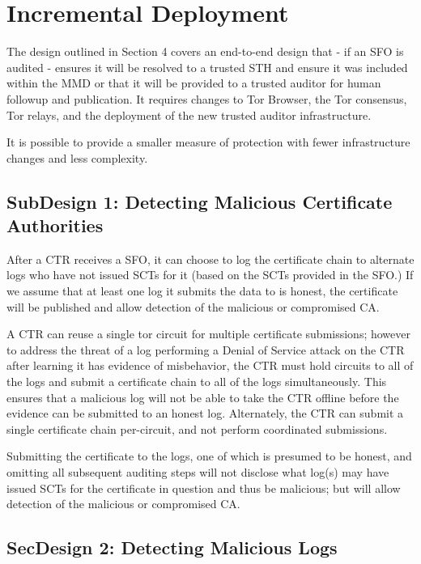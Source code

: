 \section{Incremental Deployment} \label{sec:incremental}

The design outlined in Section 4 covers an end-to-end design that - if an SFO
is audited - ensures it will be resolved to a trusted STH and ensure it was
included within the MMD or that it will be provided to a trusted auditor for
human followup and publication. It requires changes to Tor Browser, the Tor
consensus, Tor relays, and the deployment of the new trusted auditor
infrastructure.

It is possible to provide a smaller measure of protection with fewer infrastructure
changes and less complexity.

\subsection{SubDesign 1: Detecting Malicious Certificate Authorities}

After a CTR receives a SFO, it can choose to log the certificate chain to alternate
logs who have not issued SCTs for it (based on the SCTs provided in the SFO.) If
we assume that at least one log it submits the data to is honest, the certificate will
be published and allow detection of the malicious or compromised CA.

A CTR can reuse a single tor circuit for multiple certificate submissions; however
to address the threat of a log performing a Denial of Service attack on the CTR
after learning it has evidence of misbehavior, the CTR must hold circuits to all of
the logs and submit a certificate chain to all of the logs simultaneously. This
ensures that a malicious log will not be able to take the CTR offline before the
evidence can be submitted to an honest log. Alternately, the CTR can submit a single
certificate chain per-circuit, and not perform coordinated submissions.

Submitting the certificate to the logs, one of which is presumed to be honest, and
omitting all subsequent auditing steps will not disclose what log(s) may have issued
SCTs for the certificate in question and thus be malicious; but will allow detection
of the malicious or compromised CA.

\subsection{SecDesign 2: Detecting Malicious Logs}

